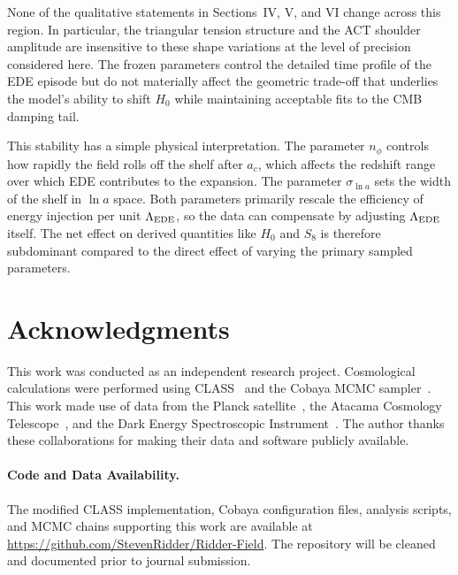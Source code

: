 \documentclass[a4paper,11pt]{article}
\begin{document}
None of the qualitative statements in Sections~IV, V, and VI change across this region. In particular, the triangular tension structure and the ACT shoulder amplitude are insensitive to these shape variations at the level of precision considered here. The frozen parameters control the detailed time profile of the EDE episode but do not materially affect the geometric trade-off that underlies the model's ability to shift $H_0$ while maintaining acceptable fits to the CMB damping tail.

This stability has a simple physical interpretation. The parameter $n_\phi$ controls how rapidly the field rolls off the shelf after $a_c$, which affects the redshift range over which EDE contributes to the expansion. The parameter $\sigma_{\ln a}$ sets the width of the shelf in $\ln a$ space. Both parameters primarily rescale the efficiency of energy injection per unit $\Lambda_{\rm EDE}$, so the data can compensate by adjusting $\Lambda_{\rm EDE}$ itself. The net effect on derived quantities like $H_0$ and $S_8$ is therefore subdominant compared to the direct effect of varying the primary sampled parameters.


\section*{Acknowledgments}

This work was conducted as an independent research project. Cosmological calculations were performed using CLASS~\cite{CLASS} and the Cobaya MCMC sampler~\cite{Cobaya}. This work made use of data from the Planck satellite~\cite{Planck2018,Planck2018_params}, the Atacama Cosmology Telescope~\cite{ACT_DR6}, and the Dark Energy Spectroscopic Instrument~\cite{DESI2024}. The author thanks these collaborations for making their data and software publicly available.

\paragraph{Code and Data Availability.}
The modified CLASS implementation, Cobaya configuration files, analysis scripts, and MCMC chains supporting this work are available at \url{https://github.com/StevenRidder/Ridder-Field}. The repository will be cleaned and documented prior to journal submission.
\end{document}
